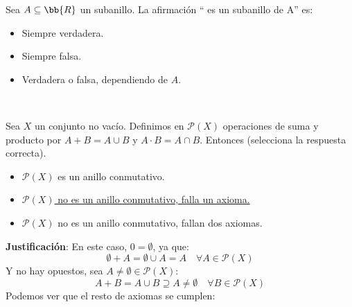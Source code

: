 \begin{ejercicio}
    Sea $A \subseteq \bb{R}$ un subanillo. La afirmación `` es un subanillo de A'' es:
    \begin{itemize}
        \item Siempre verdadera.
        \item Siempre falsa.
        \item Verdadera o falsa, dependiendo de $A$.
    \end{itemize}
\end{ejercicio}

\newpage
\ %
\resetearcontador

\begin{ejercicio}
    Sea $X$ un conjunto no vacío. Definimos en $\mathcal{P}(X)$ operaciones de suma y producto por $A+B = A \cup B$ y $A \cdot B = A \cap B$. Entonces (selecciona la respuesta correcta).
    \begin{itemize}
        \item $\mathcal{P}(X)$ es un anillo conmutativo.
        \item \underline{$\mathcal{P}(X)$ no es un anillo conmutativo, falla un axioma.}
        \item $\mathcal{P}(X)$ no es un anillo conmutativo, fallan dos axiomas.
    \end{itemize}

    \noindent
    \textbf{Justificación}:
    En este caso, $0 = \emptyset$, ya que:
    \begin{equation*}
        \emptyset + A = \emptyset \cup A = A\quad\forall A \in \mathcal{P}(X)
    \end{equation*}
    Y no hay opuestos, sea $A\neq \emptyset \in \mathcal{P}(X)$:
    \begin{equation*}
        A + B = A \cup B \supseteq A \neq \emptyset\quad\forall B \in \mathcal{P}(X)
    \end{equation*}
    Podemos ver que el resto de axiomas se cumplen:
    

\end{ejercicio}
